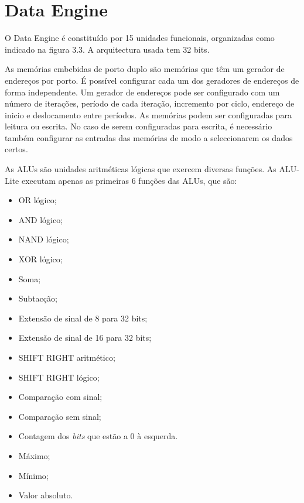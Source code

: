 

\section{Data Engine}
\label{section:Data Engine}

O Data Engine é constituído por 15 unidades funcionais, organizadas como indicado na figura 3.3. A arquitectura usada tem 32 bits.



As memórias embebidas de porto duplo são memórias que têm um gerador de endereços por porto. É possível configurar cada um dos geradores de endereços de forma independente. Um gerador de endereços pode ser configurado com um número de iterações, período de cada iteração, incremento por ciclo, endereço de inicio e deslocamento entre períodos. 
As memórias podem ser configuradas para leitura ou escrita. No caso de serem configuradas para escrita, é necessário também configurar as entradas das memórias de modo a seleccionarem os dados certos.

As ALUs são unidades aritméticas lógicas que exercem diversas funções. As ALU-Lite executam apenas as primeiras 6 funções das ALUs, que são: 

\begin{itemize}
  \item OR lógico;
  \item AND lógico;
  \item NAND lógico;
  \item XOR lógico;
  \item Soma;
  \item Subtacção;
  \item Extensão de sinal de 8 para 32 bits;
  \item Extensão de sinal de 16 para 32 bits;
  \item SHIFT RIGHT aritmético;
  \item SHIFT RIGHT lógico;
  \item Comparação com sinal;
  \item Comparação sem sinal;
  \item Contagem dos {\it bits} que estão a 0 à esquerda.
  \item Máximo; 
  \item Mínimo;
  \item Valor absoluto.
\end{itemize}

